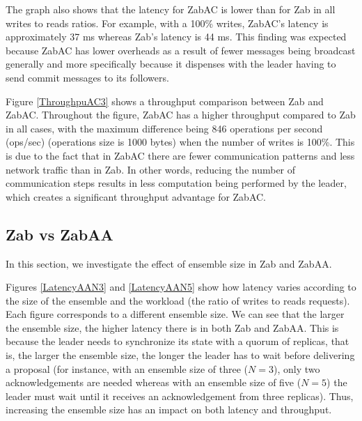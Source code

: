\documentclass[a4paper,UKenglish]{oasics-v2016}
\begin{document}
The graph also shows that the latency for ZabAC is lower than for Zab in all writes to reads ratios. For example, with a 100\% writes, ZabAC's latency is approximately 37 ms whereas Zab's latency is 44 ms. This finding was expected because ZabAC has lower overheads as a result of fewer messages being broadcast generally and more specifically because it dispenses with the leader having to send commit messages to its followers.





Figure \ref{ThroughpuAC3} shows a throughput comparison between Zab and ZabAC. Throughout the figure, ZabAC has a higher throughput compared to Zab in all cases, with the maximum difference being 846 operations per second (ops/sec)  (operations size is 1000 bytes) when the number of writes is 100\%. This is due to the fact that in ZabAC there are fewer communication patterns and less network traffic than in Zab. In other words, reducing the number of communication steps results in less computation being performed by the leader, which creates a significant throughput advantage for ZabAC. 

\subsection{Zab vs ZabAA}

In this section, we investigate the effect of ensemble size in Zab and ZabAA. 


Figures \ref{LatencyAAN3} and \ref{LatencyAAN5} show how latency varies according to the size of the ensemble and the workload (the ratio of writes to reads requests). Each figure corresponds to a different ensemble size. We can see that the larger the ensemble size, the higher latency there is in both Zab and ZabAA. This is because the leader needs to synchronize its state with a quorum of replicas, that is, the larger the ensemble size, the longer the leader has to wait before delivering a proposal (for instance, with an ensemble size of three ($N=3$), only two acknowledgements are needed whereas with an ensemble size of five ($N=5$) the leader must wait until it receives an acknowledgement from three replicas). Thus, increasing the ensemble size has an impact on both latency and throughput.
\end{document}
